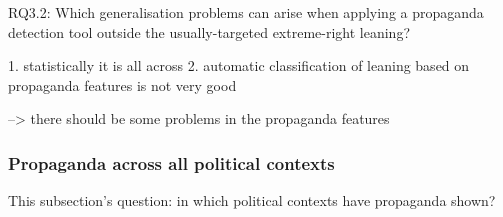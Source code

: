 
RQ3.2: Which generalisation problems can arise when applying a propaganda detection tool outside the usually-targeted extreme-right leaning?



1. statistically it is all across
2. automatic classification of leaning based on propaganda features is not very good

--> there should be some problems in the propaganda features








\subsubsection{Propaganda across all political contexts}
This subsection’s question: in which political contexts have propaganda shown?


